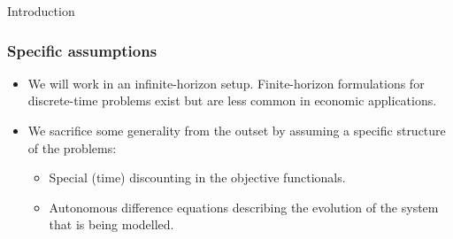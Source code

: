 \documentclass[10pt]{beamer}
\theoremstyle{definition}
\begin{document}
\begin{section}{Introduction}
\begin{frame}[fragile]
\frametitle{Specific assumptions}
\begin{itemize}\itemsep1em
\item We will work in an infinite-horizon setup. Finite-horizon formulations for discrete-time problems exist but are less common in economic applications.
\item We sacrifice some generality from the outset by assuming a specific structure of the problems:
	\begin{itemize}
	\item Special (time) discounting in the objective functionals.
	\item Autonomous difference equations describing the evolution of the system that is being modelled.
	\end{itemize}
\end{itemize}
\end{frame}


\end{section}
\end{document}
